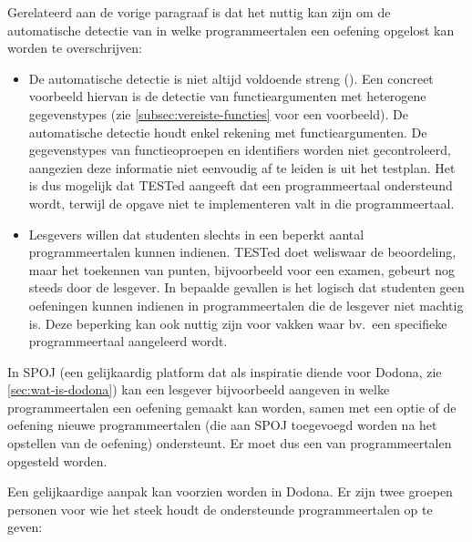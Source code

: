 Gerelateerd aan de vorige paragraaf is dat het nuttig kan zijn om de automatische detectie van in welke programmeertalen een oefening opgelost kan worden te overschrijven:
\begin{itemize}
    \item De automatische detectie is niet altijd voldoende streng ().
    Een concreet voorbeeld hiervan is de detectie van functieargumenten met heterogene gegevenstypes (zie \cref{subsec:vereiste-functies} voor een voorbeeld).
    De automatische detectie houdt enkel rekening met  functieargumenten.
    De gegevenstypes van functieoproepen en identifiers worden niet gecontroleerd, aangezien deze informatie niet eenvoudig af te leiden is uit het testplan.
    Het is dus mogelijk dat TESTed aangeeft dat een programmeertaal ondersteund wordt, terwijl de opgave niet te implementeren valt in die programmeertaal.
    \item Lesgevers willen dat studenten slechts in een beperkt aantal programmeertalen kunnen indienen.
    TESTed doet weliswaar de beoordeling, maar het toekennen van punten, bijvoorbeeld voor een examen, gebeurt nog steeds door de lesgever.
    In bepaalde gevallen is het logisch dat studenten geen oefeningen kunnen indienen in programmeertalen die de lesgever niet machtig is.
    Deze beperking kan ook nuttig zijn voor vakken waar bv.\ een specifieke programmeertaal aangeleerd wordt.
\end{itemize}

In SPOJ (een gelijkaardig platform dat als inspiratie diende voor Dodona, zie \cref{sec:wat-is-dodona}) kan een lesgever bijvoorbeeld aangeven in welke programmeertalen een oefening gemaakt kan worden, samen met een optie of de oefening nieuwe programmeertalen (die aan SPOJ toegevoegd worden na het opstellen van de oefening) ondersteunt.
Er moet dus een  van programmeertalen opgesteld worden.

Een gelijkaardige aanpak kan voorzien worden in Dodona.
Er zijn twee groepen personen voor wie het steek houdt de ondersteunde programmeertalen op te geven:

